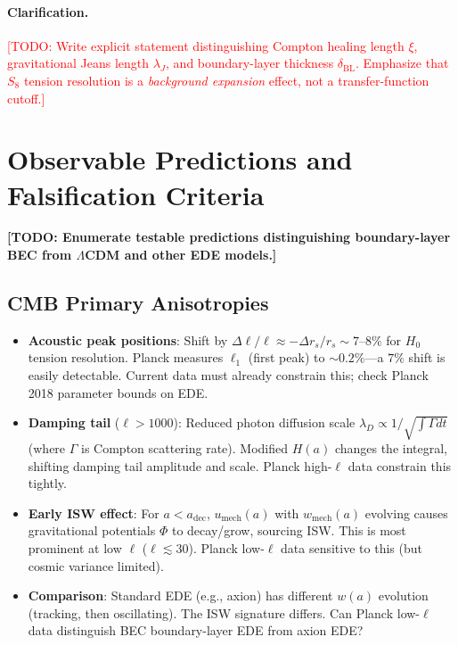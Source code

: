\documentclass[11pt,a4paper]{article}
\newcommand{\umech}{\ensuremath{u_{\mathrm{mech}}}}
\newcommand{\wmech}{\ensuremath{w_{\mathrm{mech}}}}
\newcommand{\adec}{\ensuremath{a_{\mathrm{dec}}}}
\newcommand{\rs}{\ensuremath{r_s}}
\newcommand{\deltaBL}{\ensuremath{\delta_{\mathrm{BL}}}}
\newcommand{\lambdaJ}{\ensuremath{\lambda_J}}
\theoremstyle{definition}
\theoremstyle{remark}
\begin{document}
\paragraph{Clarification.}
\textcolor{red}{[TODO: Write explicit statement distinguishing Compton healing length $\xi$, gravitational Jeans length $\lambdaJ$, and boundary-layer thickness $\deltaBL$. Emphasize that $S_8$ tension resolution is a \emph{background expansion} effect, not a transfer-function cutoff.]}

\section{Observable Predictions and Falsification Criteria}
\label{sec:observables}

\textbf{[TODO: Enumerate testable predictions distinguishing boundary-layer BEC from $\Lambda$CDM and other EDE models.]}

\subsection{CMB Primary Anisotropies}
\label{sec:cmb_primary}

\begin{itemize}[leftmargin=*, itemsep=0.3em]
\item \textbf{Acoustic peak positions}: Shift by $\Delta\ell/\ell \approx -\Delta\rs/\rs \sim 7$--$8\%$ for $H_0$ tension resolution. Planck measures $\ell_1$ (first peak) to $\sim 0.2\%$---a $7\%$ shift is easily detectable. Current data must already constrain this; check Planck 2018 parameter bounds on EDE.
\item \textbf{Damping tail} ($\ell > 1000$): Reduced photon diffusion scale $\lambda_D \propto 1/\sqrt{\int \Gamma dt}$ (where $\Gamma$ is Compton scattering rate). Modified $H(a)$ changes the integral, shifting damping tail amplitude and scale. Planck high-$\ell$ data constrain this tightly.
\item \textbf{Early ISW effect}: For $a < \adec$, $\umech(a)$ with $\wmech(a)$ evolving causes gravitational potentials $\Phi$ to decay/grow, sourcing ISW. This is most prominent at low $\ell$ ($\ell \lesssim 30$). Planck low-$\ell$ data sensitive to this (but cosmic variance limited).
\item \textbf{Comparison}: Standard EDE (e.g., axion) has different $w(a)$ evolution (tracking, then oscillating). The ISW signature differs. Can Planck low-$\ell$ data distinguish BEC boundary-layer EDE from axion EDE?
\end{itemize}
\end{document}
